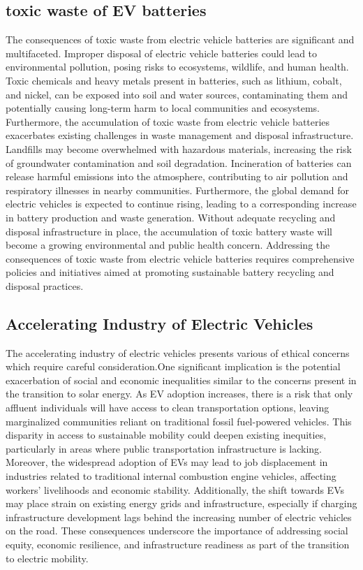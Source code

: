\documentclass[10pt,twocolumn]{article}
\begin{document}
\subsection{toxic waste of EV batteries}

The consequences of toxic waste from electric vehicle batteries are significant and multifaceted. Improper disposal of electric vehicle batteries could lead to environmental pollution, posing risks to ecosystems, wildlife, and human health. Toxic chemicals and heavy metals present in batteries, such as lithium, cobalt, and nickel, can be exposed into soil and water sources, contaminating them and potentially causing long-term harm to local communities and ecosystems. Furthermore, the accumulation of toxic waste from electric vehicle batteries exacerbates existing challenges in waste management and disposal infrastructure. Landfills may become overwhelmed with hazardous materials, increasing the risk of groundwater contamination and soil degradation. Incineration of batteries can release harmful emissions into the atmosphere, contributing to air pollution and respiratory illnesses in nearby communities. Furthermore, the global demand for electric vehicles is expected to continue rising, leading to a corresponding increase in battery production and waste generation. Without adequate recycling and disposal infrastructure in place, the accumulation of toxic battery waste will become a growing environmental and public health concern. Addressing the consequences of toxic waste from electric vehicle  batteries requires comprehensive policies and initiatives aimed at promoting sustainable battery recycling and disposal practices. 

\subsection{Accelerating Industry of Electric Vehicles}
The accelerating industry of electric vehicles presents various of ethical concerns which require careful consideration.One significant implication is the potential exacerbation of social and economic inequalities similar to the concerns present in the transition to solar energy. As EV adoption increases, there is a risk that only affluent individuals will have access to clean transportation options, leaving marginalized communities reliant on traditional fossil fuel-powered vehicles. This disparity in access to sustainable mobility could deepen existing inequities, particularly in areas where public transportation infrastructure is lacking. Moreover, the widespread adoption of EVs may lead to job displacement in industries related to traditional internal combustion engine vehicles, affecting workers' livelihoods and economic stability. Additionally, the shift towards EVs may place strain on existing energy grids and infrastructure, especially if charging infrastructure development lags behind the increasing number of electric vehicles on the road. These consequences underscore the importance of addressing social equity, economic resilience, and infrastructure readiness as part of the transition to electric mobility.
\end{document}
